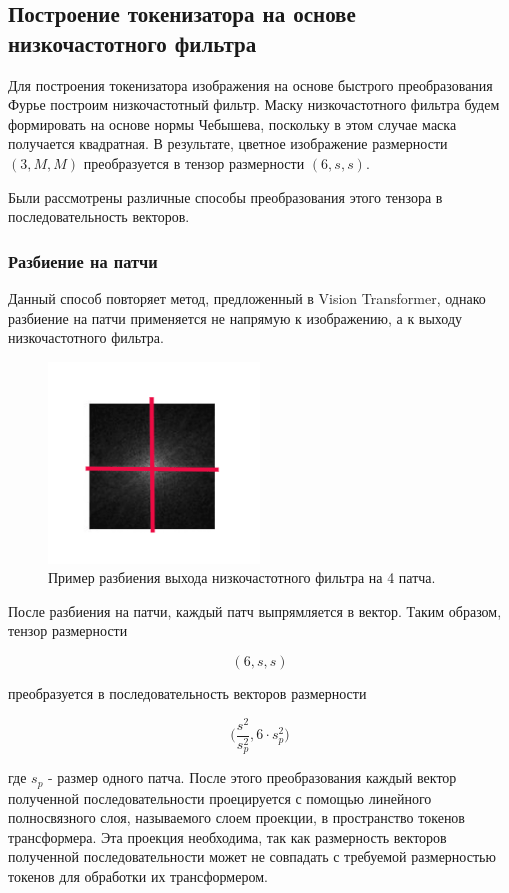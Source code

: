 \documentclass[times,specification,annotation]{itmo-student-thesis}
\begin{document}
\subsection{Построение токенизатора на основе низкочастотного фильтра}

Для построения токенизатора изображения на основе быстрого преобразования Фурье построим низкочастотный фильтр. Маску низкочастотного фильтра будем формировать на основе нормы Чебышева, поскольку в этом случае маска получается квадратная. В результате, цветное изображение размерности $(3, M, M)$ преобразуется в тензор размерности $(6, s, s)$. 

Были рассмотрены различные способы преобразования этого тензора в последовательность векторов.

\subsubsection{Разбиение на патчи}

Данный способ повторяет метод, предложенный в Vision Transformer, однако разбиение на патчи применяется не напрямую к изображению, а к выходу низкочастотного фильтра.

\begin{figure}[H]
    \centering
    \includegraphics[width=0.5\textwidth]
    {images/research/fourier/patches_split.png}
    \caption{Пример разбиения выхода низкочастотного фильтра на 4 патча.}
\end{figure}

После разбиения на патчи, каждый патч выпрямляется в вектор. Таким образом, тензор размерности 

$$ (6, s, s)$$ 

преобразуется в последовательность векторов размерности 

$$\Big(\dfrac{s^2}{s_p^2}, 6 \cdot s_p^2\Big)$$ 

где $s_p$ - размер одного патча. После этого преобразования каждый вектор полученной последовательности проецируется с помощью линейного полносвязного слоя, называемого слоем проекции, в пространство токенов трансформера. Эта проекция необходима, так как размерность векторов полученной последовательности может не совпадать с требуемой размерностью токенов для обработки их трансформером. 
\end{document}
